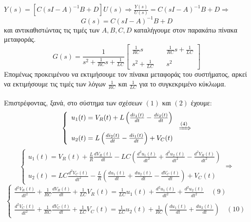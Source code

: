 \documentclass[12pt]{article}
\begin{document}
$Y(s)=[C(sI-A)^{-1}B+D]U(s) \Rightarrow \frac{Y(s)}{U(s)}=C(sI-A)^{-1}B+D \Rightarrow $ 
\[
G(s)=C(sI-A)^{-1}B+D
\]
και αντικαθιστώντας τις τιμές των $A,B,C,D$ καταλήγουμε στον παρακάτω πίνακα μεταφοράς.
\[
G(s)=\frac{1}{s^{2}+\frac{1}{RC}s+\frac{1}{LC}}
\begin{bmatrix}
    \frac{1}{RC}s  & \quad \frac{1}{RC}s+\frac{1}{LC} \\ \\
   s^{2}+\frac{1}{LC}  & \quad s^{2} 
\end{bmatrix}
\]
Επομένως προκειμένου να εκτιμήσουμε τον πίνακα μεταφοράς του συστήματος, αρκεί να εκτιμήσουμε τις τιμές των λόγων $\frac{1}{RC}$ και $\frac{1}{LC}$ για το συγκεκριμένο κύκλωμα.
\\ \\
Επιστρέφοντας, ξανά, στο σύστημα των σχέσεων $(1)$ και $(2)$ έχουμε:
\[
   \left\{
                \begin{array}{ll}
                  u_{1}(t)=V_{R}(t)+L\left(\frac{di_{1}(t)}{dt}-\frac{di_{2}(t)}{dt}\right) \\ \\
                  u_{2}(t)=L\left(\frac{di_{2}(t)}{dt}-\frac{di_{1}(t)}{dt}\right)+V_{C}(t)
                \end{array}
              \right.
\xRightarrow{(4)}
\]
\[
   \left\{
                \begin{array}{ll}
                  u_{1}(t)=V_{R}(t)+\frac{L}{R}\frac{dV_{R}(t)}{dt}-LC\left( \frac{d^{2}u_{1}(t)}{dt^{2}}+\frac{d^{2}u_{2}(t)}{dt^{2}}-\frac{d^{2}V_{R}(t)}{dt^{2}}\right) \\ \\
                   u_{2}(t)=LC\frac{d^{2}V_{C}(t)}{dt^{2}}-\frac{L}{R}\left( \frac{du_{1}(t)}{dt}+\frac{du_{2}(t)}{dt}-\frac{dV_{C}(t)}{dt}\right)+V_{C}(t)
                \end{array}
              \right. \Rightarrow
\] 
\[
   \left\{
                \begin{array}{ll}
                  \frac{d^{2}V_{R}(t)}{dt^{2}}+\frac{1}{RC}\frac{dV_{R}(t)}{dt}+\frac{1}{LC}V_{R}(t)=\frac{1}{LC}u_{1}(t)+\frac{d^{2}u_{1}(t)}{dt^{2}}+\frac{d^{2}u_{2}(t)}{dt^{2}} \quad (9)\\ \\
                    \frac{d^{2}V_{C}(t)}{dt^{2}}+\frac{1}{RC}\frac{dV_{C}(t)}{dt}+\frac{1}{LC}V_{C}(t)=\frac{1}{LC}u_{2}(t)+\frac{1}{RC}\left(\frac{du_{1}(t)}{dt}+\frac{du_{2}(t)}{dt}\right) \quad (10)
                \end{array}
              \right.
\]      
\end{document}
